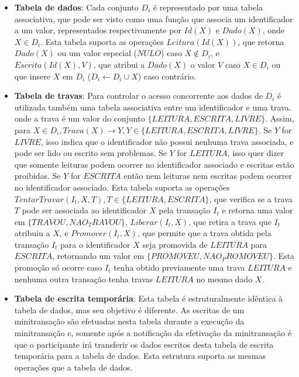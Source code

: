 \documentclass[11pt,twoside,a4paper]{book}
\begin{document}
\begin{itemize}

\item \textbf{Tabela de dados}: Cada conjunto \(D_i\) é representado por uma tabela associativa, que pode ser visto como uma função que associa um identificador a um valor, representados respectivamente por \(Id(X)\) e \(Dado(X)\), onde \(X \in D_i\). Esta tabela suporta as operações \(Leitura(Id(X))\), que retorna \(Dado(X)\) ou um valor especial (\(NULO\)) caso \(X \notin D_i\), e \(Escrita(Id(X), V)\), que atribui a \(Dado(X)\) o valor \(V\) caso $X \in D_i$ ou  que insere $X$ em $D_i$ ($D_i \gets D_i \cup X$) caso contrário. 

\item \textbf{Tabela de travas}: Para controlar o acesso concorrente aos dados de \(D_i\) é utilizada também uma tabela associativa entre um identificador e uma trava. onde a trava é um valor do conjunto \(\{LEITURA, ESCRITA, LIVRE\}\). Assim, para \(X \in D_i, Trava(X) \rightarrow Y, Y \in \{LEITURA, ESCRITA, LIVRE\}\). Se \(Y\) for \(LIVRE\), isso indica que o identificador não possui nenhuma trava associada, e pode ser lido ou escrito sem problemas. Se \(Y\) for \(LEITURA\), isso quer dizer que somente leituras podem ocorrer no identificador associado e escritas estão proibidas. Se \(Y\) for \(ESCRITA\) então nem leituras nem escritas podem ocorrer no identificador associado. Esta tabela suporta as operações \(TentarTravar(I_t, X, T), T \in \{LEITURA, ESCRITA\}\), que verifica se a trava \(T\) pode ser associada ao identificador \(X\) pela transação \(I_t\) e retorna uma valor em $\{TRAVOU, NAO_TRAVOU\}$, \(Liberar(I_t, X)\), que retira a trava que \(I_t\) atribuiu a \(X\), e $Promover(I_t, X)$, que permite que a trava obtida pela transação $I_t$ para o identificador $X$ seja promovida de $LEITURA$ para $ESCRITA$, retornando um valor em $\{PROMOVEU, NAO_PROMOVEU\}$. Esta promoção só ocorre caso $I_t$ tenha obtido previamente uma trava $LEITURA$ e nenhuma outra transação tenha travas $LEITURA$ no mesmo dado $X$.

\item \textbf{Tabela de escrita temporária}: Esta tabela é estruturalmente idêntica à tabela de dados, mas seu objetivo é diferente. As escritas de um minitransação são efetuadas nesta tabela durante a execução da minitransação e, somente após a notificação da efetivação da minitransação é que o participante irá transferir os dados escritos desta tabela de escrita temporária para a tabela de dados. Esta estrutura suporta as mesmas operações que a tabela de dados.
\end{itemize}
\end{document}
